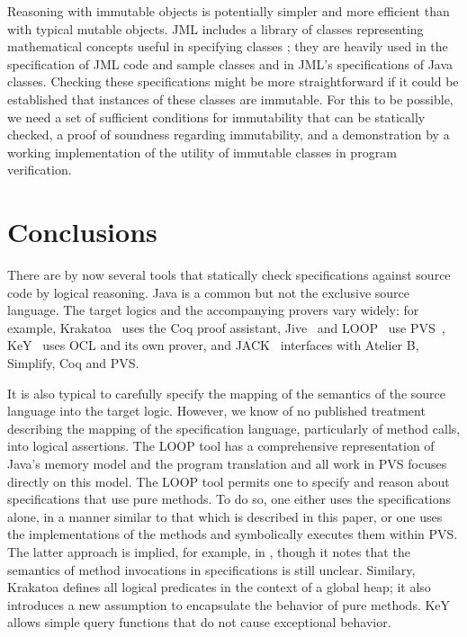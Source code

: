 \documentclass{sig-alternate2}
\begin{document}
Reasoning with immutable objects is potentially simpler and more efficient than with typical
mutable objects.  JML includes a library of classes representing mathematical 
concepts useful in specifying classes \cite{Leavens-etal03a}; they are heavily used in
the specification of JML code and sample classes and in JML's specifications of Java classes.
Checking these specifications might be more straightforward if it could be 
established that instances of these classes are immutable.  For this to be possible, we need 
a set of sufficient conditions for immutability that can be statically checked, a proof of 
soundness regarding immutability, and a demonstration by a working implementation
of the utility of immutable classes in program verification.


\section{Conclusions}

There are by now several tools
 that statically check specifications against source code by logical reasoning.
Java is a common but not the exclusive source language.  The target logics and the
accompanying provers vary widely:  for example,
Krakatoa~\cite{krakatoa03a} uses the Coq proof assistant, 
Jive~\cite{MeyerMuellerPoetzsch-Heffter00-linesplit}
and LOOP~\cite{Jacobs04,JacobsPoll01a} use PVS~\cite{OwreRRSS96},
KeY~\cite{Key2003} uses OCL and its own prover, 
and JACK~\cite{BurdyRequet02} interfaces with 
Atelier B, Simplify, Coq and PVS.

It is also typical to carefully specify the mapping of the semantics of the source language
into the target logic.  However, we know of no published treatment 
describing the mapping of
the specification language, particularly of method calls, into logical assertions.  
The LOOP tool has a comprehensive representation of Java's memory
model and the program translation and all work in PVS focuses directly
on this model.  The LOOP tool permits one to specify and reason about
specifications that use pure methods. To do so, one either uses the
specifications alone, in a manner similar to that which is described
in this paper, or one uses the implementations of the methods and 
symbolically executes them within PVS.
The latter approach is implied, for example, in \cite{JacobsKiniryWarnier03},
though it notes that the semantics of method invocations in specifications is still unclear.
Similary, Krakatoa defines all logical predicates in the context of a global heap; 
it also introduces a new assumption to encapsulate the behavior of pure
methods.  KeY allows simple query functions that do not cause exceptional behavior.
\end{document}
